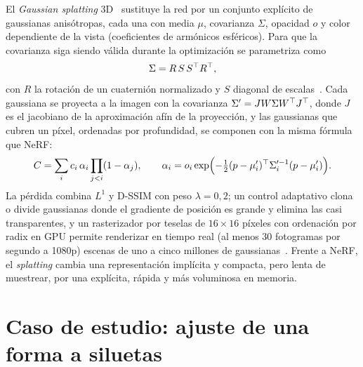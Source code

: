 El \emph{Gaussian splatting} 3D~\cite{gs} sustituye la red por un conjunto explícito de gaussianas anisótropas, cada una con media $\mu$, covarianza $\Sigma$, opacidad $o$ y color dependiente de la vista (coeficientes de armónicos esféricos). Para que la covarianza siga siendo válida durante la optimización se parametriza como
\[
\Sigma=R\,S\,S^\top R^\top,
\]
con $R$ la rotación de un cuaternión normalizado y $S$ diagonal de escalas~\cite[§4]{gs}. Cada gaussiana se proyecta a la imagen con la covarianza $\Sigma'=JW\Sigma W^\top J^\top$, donde $J$ es el jacobiano de la aproximación afín de la proyección, y las gaussianas que cubren un píxel, ordenadas por profundidad, se componen con la misma fórmula que NeRF:
\[
C=\sum_i c_i\,\alpha_i\prod_{j<i}(1-\alpha_j),\qquad \alpha_i=o_i\exp\Bigl(-\tfrac12(p-\mu_i')^\top\Sigma_i'^{-1}(p-\mu_i')\Bigr).
\]
La pérdida combina $L^1$ y D-SSIM con peso $\lambda=0{,}2$; un control adaptativo clona o divide gaussianas donde el gradiente de posición es grande y elimina las casi transparentes, y un rasterizador por teselas de $16\times 16$ píxeles con ordenación por radix en GPU permite renderizar en tiempo real (al menos 30 fotogramas por segundo a 1080p) escenas de uno a cinco millones de gaussianas~\cite{gs}. Frente a NeRF, el \emph{splatting} cambia una representación implícita y compacta, pero lenta de muestrear, por una explícita, rápida y más voluminosa en memoria.

\section{Caso de estudio: ajuste de una forma a siluetas}


